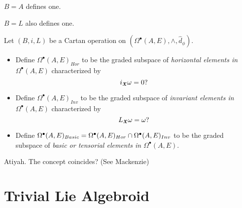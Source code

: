 {\begin{example}
$B = A$ defines one.
\end{example}

\begin{example}
$B = L$ also defines one.
\end{example}

\begin{definition}
Let $(B, i, L)$ be a Cartan operation on $(\Omega^\bullet(A, E), \wedge, \hat d_\phi)$.
    
    \begin{itemize}
        
    \item Define $\Omega^\bullet(A, E)_{Hor}$ to be the graded subspace of \emph{horizontal elements in $\Omega^\bullet(A, E)$} characterized by 
    \[
    i_{\bm{\mathfrak{X}}} \omega = 0?
    \]
    
    \item Define $\Omega^\bullet(A, E)_{Inv}$ to be the graded subspace of \emph{invariant elements in $\Omega^\bullet(A, E)$} characterized by 
    \[
    L_{\bm{\mathfrak{X}}} \omega = \omega?
    \]
    
    \item Define $\Omega^\bullet(A, E)_{Basic} = \Omega^\bullet(A, E)_{Hor} \cap \Omega^\bullet(A, E)_{Inv}$ to be the graded subspace of \emph{basic or tensorial elements in $\Omega^\bullet(A, E)$}.
        
    \end{itemize}
    
\end{definition}

\begin{example}
Atiyah. The concept coincides? (See Mackenzie)
\end{example}}
\section{Trivial Lie Algebroid}

